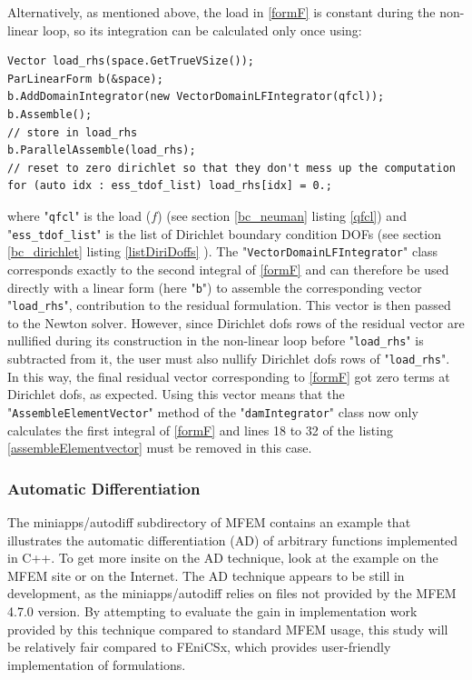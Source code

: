 \documentclass[12pt]{article}
\newcommand{\f}[1]{FEniCSx#1}
\newcommand{\mycode}[1]{\textsf{"}\lstinline`#1`\textsf{"}}
\begin{document}
Alternatively, as mentioned above, the load in \eqref{formF} is constant during the non-linear loop, so its integration can be calculated only once using:
\begin{lstlisting}[numbers=none,basicstyle=\scriptsize,label=loadform]
Vector load_rhs(space.GetTrueVSize());
ParLinearForm b(&space);
b.AddDomainIntegrator(new VectorDomainLFIntegrator(qfcl));
b.Assemble();
// store in load_rhs
b.ParallelAssemble(load_rhs);
// reset to zero dirichlet so that they don't mess up the computation
for (auto idx : ess_tdof_list) load_rhs[idx] = 0.;
\end{lstlisting}
where \mycode{qfcl} is the load ($f$) (see section \ref{bc_neuman} listing \ref{qfcl}) and \mycode{ess_tdof_list} is the list of Dirichlet boundary condition DOFs (see section \ref{bc_dirichlet} listing \ref{listDiriDoffs} ).
The  \mycode{VectorDomainLFIntegrator} class corresponds exactly to the second integral of \eqref{formF} and can therefore be used directly with a linear form (here \mycode{b}) to assemble the corresponding vector \mycode{load_rhs}, contribution to the residual formulation. 
This vector is then passed to the Newton solver. 
However, since Dirichlet dofs rows of the residual vector are nullified during its construction in the non-linear loop before \mycode{load_rhs} is subtracted from it, the user must also nullify Dirichlet dofs rows of \mycode{load_rhs}. 
In this way, the final residual vector corresponding to \eqref{formF} got zero terms at Dirichlet dofs, as expected.
Using this vector means that the \mycode{AssembleElementVector} method of the \mycode{damIntegrator} class now only calculates the first integral of \eqref{formF} and lines 18 to 32 of the listing \ref{assembleElementvector}  must be removed in this case.

\subsubsection{Automatic Differentiation\label{AD}}
The miniapps/autodiff subdirectory of MFEM contains an example that illustrates the automatic differentiation (AD) of arbitrary functions implemented in C++. To get more insite on the AD technique, look at the example on the MFEM site or on the Internet. The AD technique appears to be still in development, as the miniapps/autodiff relies on files not provided by the MFEM 4.7.0 version.  By attempting to evaluate the gain in implementation work provided by this technique compared to standard MFEM usage, this study will be relatively fair compared to \f{}, which provides user-friendly implementation of formulations.
\end{document}
